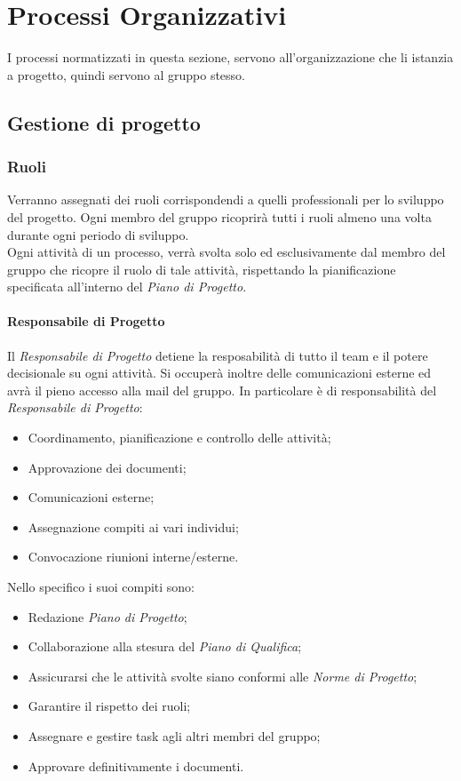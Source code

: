 \section{Processi Organizzativi}
  I processi normatizzati in questa sezione, servono all'organizzazione che li istanzia a progetto, quindi servono al gruppo stesso.
  \subsection{Gestione di progetto}
    \subsubsection{Ruoli}
      Verranno assegnati dei ruoli corrispondendi a quelli professionali per lo sviluppo del progetto. Ogni membro del gruppo ricoprirà
      tutti i ruoli almeno una volta durante ogni periodo di sviluppo.\\
      Ogni attività di un processo, verrà svolta solo ed esclusivamente dal membro del gruppo che ricopre il ruolo di tale attività, rispettando la pianificazione
      specificata all'interno del \emph{Piano di Progetto}\VersionePP.
        \paragraph{Responsabile di Progetto}
          Il \emph{Responsabile di Progetto} detiene la resposabilità di tutto il team e il potere decisionale su ogni attività. Si occuperà inoltre delle comunicazioni esterne
          ed avrà il pieno accesso alla mail del gruppo.
          In particolare è di responsabilità del \emph{Responsabile di Progetto}:
          \begin{itemize}
            \item Coordinamento, pianificazione e controllo delle attività;
            \item Approvazione dei documenti;
            \item Comunicazioni esterne;
            \item Assegnazione compiti ai vari individui;
            \item Convocazione riunioni interne/esterne.
          \end{itemize}
          Nello specifico i suoi compiti sono:
          \begin{itemize}
            \item Redazione \emph{Piano di Progetto};
            \item Collaborazione alla stesura del \emph{Piano di Qualifica};
            \item Assicurarsi che le attività svolte siano conformi alle \emph{Norme di Progetto};
            \item Garantire il rispetto dei ruoli;
            \item Assegnare e gestire task agli altri membri del gruppo;
            \item Approvare definitivamente i documenti.
          \end{itemize}
